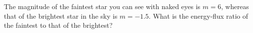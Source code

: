 The magnitude of the faintest star you can see with naked eyes is $m = 6$,
whereas that of the brightest star in the sky is $m = -1.5$. What is the
energy-flux ratio of the faintest to that of the brightest?
